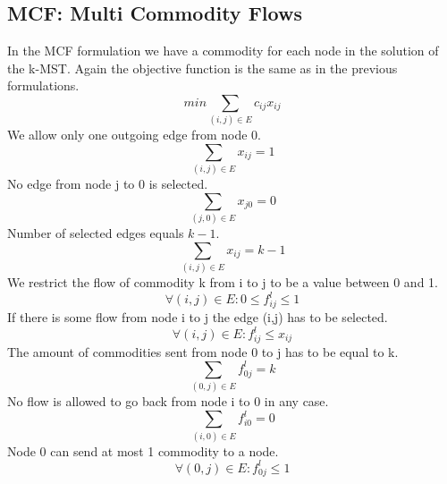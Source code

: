 \documentclass{article}
\begin{document}
\subsection{MCF: Multi Commodity Flows \label{mcf}}
In the MCF formulation we have a commodity for each node in the solution of the k-MST. Again the objective function is the same as in the previous formulations.
\setcounter{equation}{0}
\begin{equation}
min \sum_{(i,j) \in E} c_{ij} x_{ij}
\end{equation}
We allow only one outgoing edge from node 0.
\begin{equation}
\sum_{(i,j) \in E} x_{ij} = 1
\end{equation}
No edge from node j to 0 is selected.
\begin{equation}
\sum_{(j,0) \in E} x_{j0} = 0
\end{equation}
Number of selected edges equals $k-1$.
\begin{equation}
\sum_{(i,j) \in E} x_{ij} = k - 1
\end{equation}
We restrict the flow of commodity k from i to j to be a value between 0 and 1.
\begin{equation}
\forall (i,j) \in E : 0 \le f_{ij}^{l} \le 1
\end{equation}
If there is some flow from node i to j the edge (i,j) has to be selected.
\begin{equation}
\forall (i,j) \in E : f_{ij}^{l} \le x_{ij}
\end{equation}
The amount of commodities sent from node 0 to j has to be equal to k.
\begin{equation}
\sum_{(0,j) \in E} f_{0j}^{l} = k
\end{equation}
No flow is allowed to go back from node i to 0 in any case.
\begin{equation}
\sum_{(i,0) \in E} f_{i0}^{l} = 0
\end{equation}
Node 0 can send at most 1 commodity to a node.
\begin{equation}
\forall (0,j) \in E : f_{0j}^{l} \le 1
\end{equation}
\end{document}
